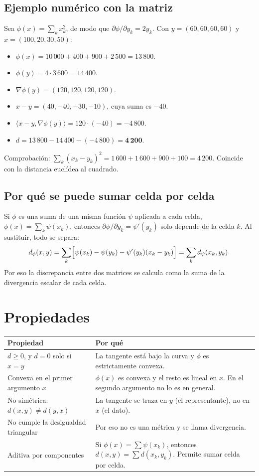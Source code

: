 \documentclass[11pt,a4paper]{article}
\begin{document}
\subsection{Ejemplo numérico con la matriz}

Sea $\phi(x)=\sum_k x_k^2$, de modo que $\partial\phi/\partial y_k=2y_k$. Con
$y=(60,60,60,60)$ y $x=(100,20,30,50)$:
\begin{itemize}
  \item $\phi(x)=10\,000+400+900+2\,500=13\,800$.
  \item $\phi(y)=4\cdot 3\,600=14\,400$.
  \item $\nabla\phi(y)=(120,120,120,120)$.
  \item $x-y=(40,-40,-30,-10)$, cuya suma es $-40$.
  \item $\langle x-y,\nabla\phi(y)\rangle=120\cdot(-40)=-4\,800$.
  \item $d=13\,800-14\,400-(-4\,800)=\mathbf{4\,200}$.
\end{itemize}
Comprobación: $\sum_k (x_k-y_k)^2=1\,600+1\,600+900+100=4\,200$. Coincide con la
distancia euclídea al cuadrado.

\subsection{Por qué se puede sumar celda por celda}

Si $\phi$ es una suma de una misma función $\psi$ aplicada a cada celda,
$\phi(x)=\sum_k\psi(x_k)$, entonces $\partial\phi/\partial y_k=\psi'(y_k)$ solo
depende de la celda $k$. Al sustituir, todo se separa:
\[
  d_\phi(x,y)=\sum_k\Bigl[\psi(x_k)-\psi(y_k)-\psi'(y_k)(x_k-y_k)\Bigr]
  =\sum_k d_\psi(x_k,y_k).
\]
Por eso la discrepancia entre dos matrices se calcula como la suma de la
divergencia escalar de cada celda.

\section{Propiedades}

\begin{center}
\renewcommand{\arraystretch}{1.25}
\begin{tabular}{@{}>{\raggedright\arraybackslash}p{5.2cm}>{\raggedright\arraybackslash}p{9.4cm}@{}}
\toprule
\textbf{Propiedad} & \textbf{Por qué} \\
\midrule
$d\ge 0$, y $d=0$ solo si $x=y$ & La tangente está bajo la curva y $\phi$ es estrictamente convexa. \\
\midrule
Convexa en el primer argumento $x$ & $\phi(x)$ es convexa y el resto es lineal en $x$. En el segundo argumento no lo es en general. \\
\midrule
No simétrica: $d(x,y)\ne d(y,x)$ & La tangente se traza en $y$ (el representante), no en $x$ (el dato). \\
\midrule
No cumple la desigualdad triangular & Por eso no es una métrica y se llama divergencia. \\
\midrule
Aditiva por componentes & Si $\phi(x)=\sum\psi(x_k)$, entonces $d(x,y)=\sum d(x_k,y_k)$. Permite sumar celda por celda. \\
\bottomrule
\end{tabular}
\end{center}
\end{document}
